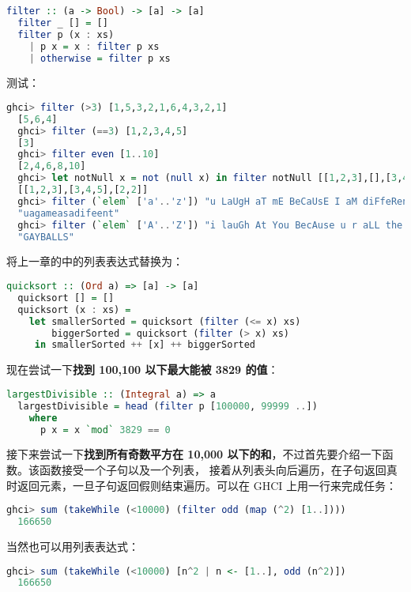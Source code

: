 \documentclass[./main.tex]{subfiles}
\begin{document}
\begin{lstlisting}[language=Haskell]
  filter :: (a -> Bool) -> [a] -> [a]
  filter _ [] = []
  filter p (x : xs)
    | p x = x : filter p xs
    | otherwise = filter p xs
\end{lstlisting}

测试：

\begin{lstlisting}[language=Haskell]
  ghci> filter (>3) [1,5,3,2,1,6,4,3,2,1]
  [5,6,4]
  ghci> filter (==3) [1,2,3,4,5]
  [3]
  ghci> filter even [1..10]
  [2,4,6,8,10]
  ghci> let notNull x = not (null x) in filter notNull [[1,2,3],[],[3,4,5],[2,2],[],[],[]]
  [[1,2,3],[3,4,5],[2,2]]
  ghci> filter (`elem` ['a'..'z']) "u LaUgH aT mE BeCaUsE I aM diFfeRent"
  "uagameasadifeent"
  ghci> filter (`elem` ['A'..'Z']) "i lauGh At You BecAuse u r aLL the Same"
  "GAYBALLS"
\end{lstlisting}

将上一章的中的列表表达式替换为：

\begin{lstlisting}[language=Haskell]
  quicksort :: (Ord a) => [a] -> [a]
  quicksort [] = []
  quicksort (x : xs) =
    let smallerSorted = quicksort (filter (<= x) xs)
        biggerSorted = quicksort (filter (> x) xs)
     in smallerSorted ++ [x] ++ biggerSorted
\end{lstlisting}

现在尝试一下\textbf{找到 100,100 以下最大能被 3829 的值}：

\begin{lstlisting}[language=Haskell]
  largestDivisible :: (Integral a) => a
  largestDivisible = head (filter p [100000, 99999 ..])
    where
      p x = x `mod` 3829 == 0
\end{lstlisting}

接下来尝试一下\textbf{找到所有奇数平方在 10,000 以下的和}，不过首先要介绍一下函数。该函数接受一个子句以及一个列表，
接着从列表头向后遍历，在子句返回真时返回元素，一旦子句返回假则结束遍历。可以在 GHCI 上用一行来完成任务：

\begin{lstlisting}[language=Haskell]
  ghci> sum (takeWhile (<10000) (filter odd (map (^2) [1..])))
  166650
\end{lstlisting}

当然也可以用列表表达式：

\begin{lstlisting}[language=Haskell]
  ghci> sum (takeWhile (<10000) [n^2 | n <- [1..], odd (n^2)])
  166650
\end{lstlisting}
\end{document}
